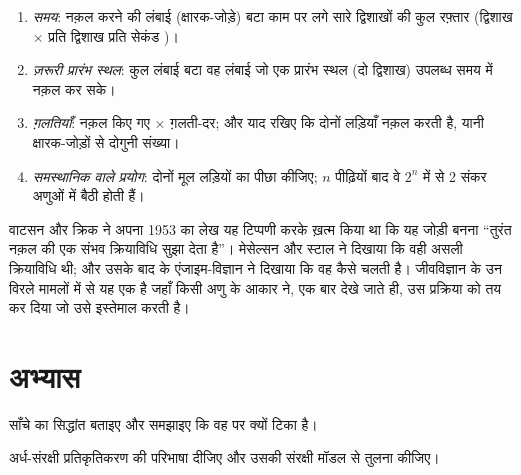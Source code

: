 \begin{method}\label{met:g11:dna-replication:calc}
\begin{enumerate}
  \item \emph{समय}: नक़ल करने की लंबाई (क्षारक-जोड़े) बटा काम पर लगे सारे
        द्विशाखों की कुल रफ़्तार (द्विशाख $\times$ प्रति द्विशाख प्रति
        सेकंड )।
  \item \emph{ज़रूरी प्रारंभ स्थल}: कुल लंबाई बटा वह लंबाई जो एक प्रारंभ
        स्थल (दो द्विशाख) उपलब्ध समय में नक़ल कर सके।
  \item \emph{ग़लतियाँ}: नक़ल किए गए  $\times$ ग़लती-दर;
        और याद रखिए कि  दोनों लड़ियाँ नक़ल करती है, यानी
        क्षारक-जोड़ों से दोगुनी संख्या।
  \item \emph{समस्थानिक वाले प्रयोग}: दोनों मूल लड़ियों का पीछा कीजिए;
        $n$ पीढ़ियों बाद वे $2^n$ में से 2 संकर अणुओं में बैठी होती हैं।
\end{enumerate}
\end{method}

\begin{remark}[बनावट और क्रियाविधि का मेल क्यों बैठता है]\label{rem:g11:dna-replication:fit}
वाटसन और क्रिक ने अपना 1953 का लेख यह टिप्पणी करके ख़त्म किया था कि यह
जोड़ी बनना ``तुरंत नक़ल की एक संभव क्रियाविधि सुझा देता है''। मेसेल्सन और
स्टाल ने दिखाया कि वही असली क्रियाविधि थी; और उसके बाद के एंजाइम-विज्ञान ने
दिखाया कि वह कैसे चलती है। जीवविज्ञान के उन विरले मामलों में से यह एक है
जहाँ किसी अणु के आकार ने, एक बार देखे जाते ही, उस प्रक्रिया को तय कर दिया
जो उसे इस्तेमाल करती है।
\end{remark}

\section{अभ्यास}

\begin{exercise}[$\star$]\label{exo:g11:dna-replication:1}
साँचे का सिद्धांत बताइए और समझाइए कि वह  पर क्यों टिका है।
\end{exercise}

\begin{exercise}[$\star$]\label{exo:g11:dna-replication:2}
अर्ध-संरक्षी प्रतिकृतिकरण की परिभाषा दीजिए और उसकी संरक्षी मॉडल से तुलना
कीजिए।
\end{exercise}

